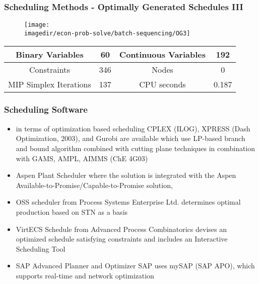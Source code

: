 \begin{frame}\frametitle{Scheduling Methods - Optimally Generated Schedules III}
	
	\cite{ierpfa} \nocite{ierpfb}
	\begin{figure}
		[!htb] 
		\begin{center}
			\texttt{[image: \\imagedir/econ-prob-solve/batch-sequencing/OG3]} \label{fig:Og3} 
		\end{center}
	\end{figure}
	\begin{center}
		\begin{tabular}
			{ c |c|c| c } \hline Binary Variables & 60 & Continuous Variables & 192\\
			\hline Constraints & 346 & Nodes & 0\\
			\hline MIP Simplex Iterations & 137 & CPU seconds & 0.187\\
			\hline 
		\end{tabular}
	\end{center}
\end{frame}

\begin{frame}\frametitle{Scheduling Software}
	\begin{itemize}
		\item	in terms of optimization based scheduling CPLEX (ILOG), XPRESS (Dash Optimization, 2003), and Gurobi are available which use LP-based branch and bound algorithm combined with cutting plane techniques in combination with GAMS, AMPL, AIMMS (ChE 4G03) 
		\item	Aspen Plant Scheduler where the solution is integrated with the Aspen Available-to-Promise/Capable-to-Promise solution, 
		\item	OSS scheduler from Process Systems Enterprise Ltd. determines optimal production based on STN as a basis 
		\item	VirtECS Schedule from Advanced Process Combinatorics devises an optimized schedule satisfying constraints and includes an Interactive Scheduling Tool 
		\item	SAP Advanced Planner and Optimizer SAP uses mySAP (SAP APO), which supports real-time and network optimization 
	\end{itemize}
\end{frame}

